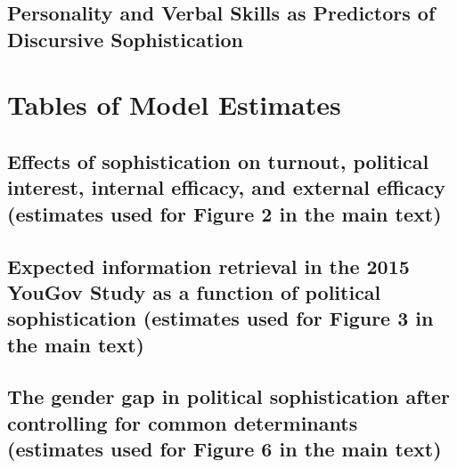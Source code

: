 \documentclass[12pt]{article}
\begin{document}
\clearpage
\subsection{Personality and Verbal Skills as Predictors of Discursive Sophistication}\label{app:determinants_rob}






\clearpage
\section{Tables of Model Estimates}\label{app:tables}

\subsection{Effects of sophistication on turnout, political interest, internal efficacy, and external efficacy (estimates used for Figure 2 in the main text)}








\clearpage


\subsection{Expected information retrieval in the 2015 YouGov Study as a function of political sophistication (estimates used for Figure 3 in the main text)}

\clearpage


\subsection{The gender gap in political sophistication after controlling for common determinants (estimates used for Figure 6 in the main text)}




\clearpage


\end{document}
